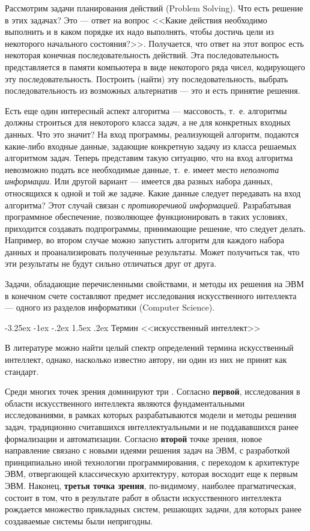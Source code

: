 \documentclass[12pt, openany, twoside]{book} %
\makeatletter
\renewcommand\section{\@startsection {section}{1}{\z@}%
                                   {-3.25ex \@plus -1ex \@minus -.2ex}%
                                   {1.5ex \@plus.2ex}%
                                   {\normalfont\large\bfseries}}
\makeatother
\begin{document}
Рассмотрим задачи планирования действий (Problem Sol\-ving). Что есть решение в этих задачах? Это --- ответ на вопрос <<Какие действия необходимо выполнить и в каком порядке их надо выполнять, чтобы достичь цели из некоторого начального состояния?>>. Получается, что ответ на этот вопрос есть некоторая конечная последовательность действий. Эта последовательность представляется в памяти компьютера в виде некоторого ряда чисел, кодирующего эту последовательность. Построить (найти) эту последовательность, выбрать последовательность из возможных альтернатив --- это и есть принятие решения.

Есть еще один интересный аспект алгоритма --- массовость, т.~е. алгоритмы должны строиться для некоторого класса задач, а не для конкретных входных данных. Что это значит? На вход программы, реализующей алгоритм, подаются какие-либо входные данные, задающие конкретную задачу из класса решаемых алгоритмом задач. Теперь представим такую ситуацию, что на вход алгоритма невозможно подать все необходимые данные, т.~е. имеет место \emph{неполнота информации}. Или другой вариант --- имеется два разных набора данных, относящихся к одной и той же задаче. Какие данные следует передавать на вход алгоритма? Этот случай связан с \emph{противоречивой информацией}. Разрабатывая программное обеспечение, позволяющее функционировать в таких условиях, приходится создавать подпрограммы, принимающие решение, что следует делать. Например, во втором случае можно запустить алгоритм для каждого набора данных и проанализировать полученные результаты. Может получиться так, что эти результаты не будут сильно отличаться друг от друга.

Задачи,  обладающие перечисленными свойствами, и методы их решения на ЭВМ в конечном счете составляют предмет исследования искусственного интеллекта --- одного из разделов информатики (Computer Science).

\section{Термин <<искусственный интеллект>>}

В литературе можно найти целый спектр определений термина искусственный интеллект, однако, насколько известно автору, ни один из них не принят как стандарт.

Среди многих точек зрения доминируют три \cite{AIDictionary}. Согласно {\bf первой}, исследования в области искусственного интеллекта являются фундаментальными исследованиями, в рамках которых разрабатываются модели и методы решения задач, традиционно считавшихся интеллектуальными и не поддававшихся ранее формализации и автоматизации. Согласно {\bf второй} точке зрения, новое направление связано с новыми идеями решения задач на ЭВМ, с разработкой принципиально иной технологии программирования, с переходом к архитектуре ЭВМ, отвергающей классическую архитектуру, которая восходит еще к первым ЭВМ. Наконец, {\bf третья точка зрения}, по-видимому, наиболее прагматическая, состоит в том, что в результате работ в области искусственного интеллекта рождается множество прикладных систем, решающих задачи, для которых ранее создаваемые системы были непригодны.
\end{document}
